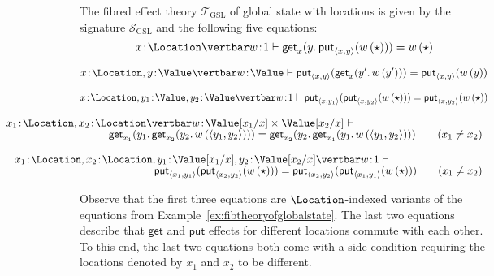 \begin{example}
\label{ex:fibtheoryofglobalstatewithlocations}
The fibred effect theory $\mathcal{T}_{\text{GSL}}$ of global state with locations is given by the signature $\mathcal{S}_{\text{GSL}}$ and the following five equations:
\[
{x \!:\! \Location \vertbar w \!:\! 1} \vdash \mathsf{get}_x(y .\, \mathsf{put}_{\langle x , y \rangle}(w\, (\star))) = w\, (\star)
\vspace{0.15cm}
\]

\[
{x \!:\! \Location, y \!:\! \Value \vertbar w \!:\! \Value} \vdash \mathsf{put}_{\langle x , y \rangle}(\mathsf{get}_x(y' .\, w\, (y'))) = \mathsf{put}_{\langle x , y \rangle}(w\, (y))
\vspace{0.15cm}
\]

\[
{x \!:\! \Location, y_1 \!:\! \Value, y_2 \!:\! \Value \vertbar w \!:\! 1} \vdash \mathsf{put}_{\langle x , y_1 \rangle}(\mathsf{put}_{\langle x , y_2 \rangle}(w\, (\star))) = \mathsf{put}_{\langle x , y_2 \rangle}(w\, (\star))
\vspace{0.15cm}
\]

\[
\begin{array}{c}
\hspace{-6.75cm}
{x_1 \!:\! \Location, x_2 \!:\! \Location \vertbar w \!:\! \Value[x_1/x] \times \Value[x_2/x]} \vdash 
\\[-0.5mm]
\hspace{0.75cm}
\mathsf{get}_{x_1}(y_1.\, \mathsf{get}_{x_2}(y_2 .\, w\, (\langle y_1 , y_2 \rangle))) = 
\mathsf{get}_{x_2}(y_2 .\, \mathsf{get}_{x_1}(y_1 .\, w\, (\langle y_1 , y_2 \rangle)))
\qquad (x_1 \neq x_2)
\end{array}
\vspace{0.15cm}
\]

\[
\begin{array}{c}
\hspace{-5.45cm}
{x_1 \!:\! \Location, x_2 \!:\! \Location, y_1 \!:\! \Value[x_1/x], y_2 \!:\! \Value[x_2/x] \vertbar w \!:\! 1} \vdash
\\[-0.5mm]
\hspace{2.25cm}
\mathsf{put}_{\langle x_1, y_1 \rangle}(\mathsf{put}_{\langle x_2, y_2 \rangle}(w\, (\star))) = \mathsf{put}_{\langle x_2, y_2 \rangle}(\mathsf{put}_{\langle x_1, y_1 \rangle}(w\, (\star)))
\qquad (x_1 \neq x_2)
\end{array}
\vspace{0.15cm}
\]

Observe that the first three equations are $\Location$-indexed variants of the equations from Example~\ref{ex:fibtheoryofglobalstate}. The last two equations describe that $\mathsf{get}$ and $\mathsf{put}$ effects for different locations commute with each other. To this end, the last two equations both come with a side-condition requiring the locations denoted by $x_1$ and $x_2$ to be different. 

\end{example}

